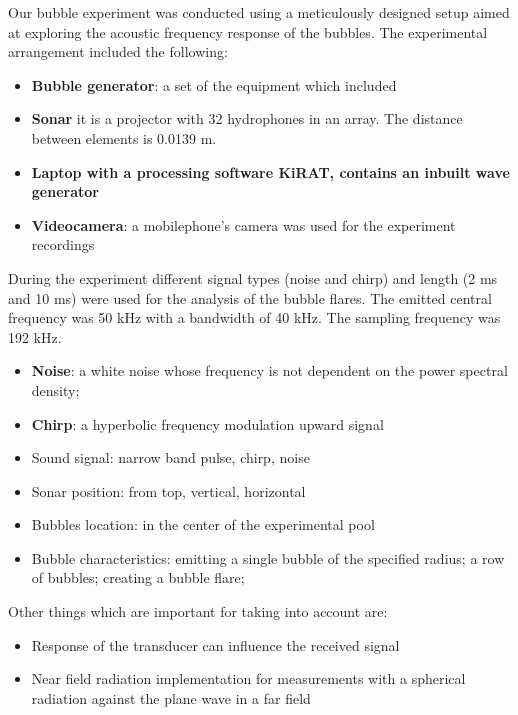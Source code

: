 Our bubble experiment was conducted using a meticulously designed setup aimed at exploring the acoustic frequency response of the bubbles. The experimental arrangement included the following:
\begin{itemize}
    \item \textbf{Bubble generator}: a set of the equipment which included
    \item \textbf{Sonar} it is a projector with 32 hydrophones in an array. The distance between elements is 0.0139 m.
    \item \textbf{Laptop with a processing software KiRAT, contains an inbuilt wave generator}
    \item \textbf{Videocamera}: a mobilephone's camera was used for the experiment recordings
\end{itemize}

During the experiment different signal types (noise and chirp) and length (2 ms and 10 ms) were used for the analysis of the bubble flares. The emitted central frequency was 50 kHz with a bandwidth of 40 kHz. The sampling frequency was 192 kHz.
\begin{itemize}
    \item \textbf{Noise}: a white noise whose frequency is not dependent on the power spectral density\cite*{ainslie_principles_2010};  
    \item \textbf{Chirp}: a hyperbolic frequency modulation upward signal 
\end{itemize}

\begin{itemize}
    \item  Sound signal: narrow band pulse, chirp, noise
    \item Sonar position: from top, vertical, horizontal
    \item Bubbles location: in the center of the experimental pool
   \item Bubble characteristics: emitting a single bubble of the specified radius; a row of bubbles; 
   creating a bubble flare;
\end{itemize}
Other things which are important for taking into account are:
\begin{itemize}
    \item Response of the transducer can influence the received signal
    \item Near field radiation implementation for measurements with a spherical radiation against the plane wave in a far field
\end{itemize}

